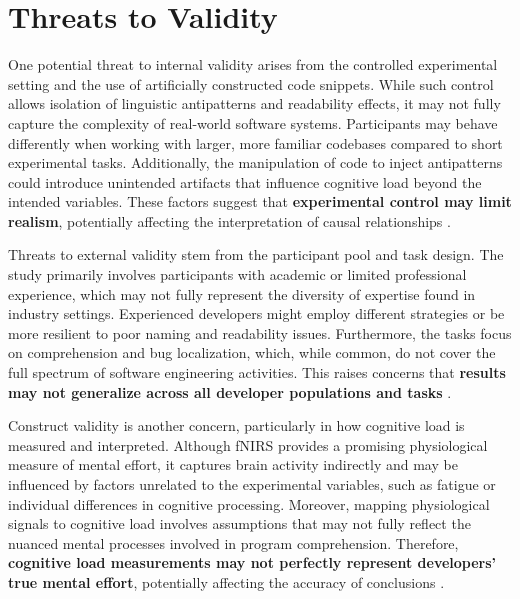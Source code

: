\section{Threats to Validity}

One potential threat to internal validity arises from the controlled experimental setting and the use of artificially constructed code snippets. While such control allows isolation of linguistic antipatterns and readability effects, it may not fully capture the complexity of real-world software systems. Participants may behave differently when working with larger, more familiar codebases compared to short experimental tasks. Additionally, the manipulation of code to inject antipatterns could introduce unintended artifacts that influence cognitive load beyond the intended variables. These factors suggest that \textbf{experimental control may limit realism}, potentially affecting the interpretation of causal relationships \cite{Siegmund2014}.

Threats to external validity stem from the participant pool and task design. The study primarily involves participants with academic or limited professional experience, which may not fully represent the diversity of expertise found in industry settings. Experienced developers might employ different strategies or be more resilient to poor naming and readability issues. Furthermore, the tasks focus on comprehension and bug localization, which, while common, do not cover the full spectrum of software engineering activities. This raises concerns that \textbf{results may not generalize across all developer populations and tasks} \cite{Fritz2014}.

Construct validity is another concern, particularly in how cognitive load is measured and interpreted. Although fNIRS provides a promising physiological measure of mental effort, it captures brain activity indirectly and may be influenced by factors unrelated to the experimental variables, such as fatigue or individual differences in cognitive processing. Moreover, mapping physiological signals to cognitive load involves assumptions that may not fully reflect the nuanced mental processes involved in program comprehension. Therefore, \textbf{cognitive load measurements may not perfectly represent developers’ true mental effort}, potentially affecting the accuracy of conclusions \cite{Siegmund2014}.
